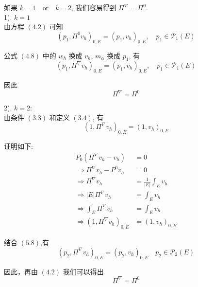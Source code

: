 如果 $k = 1 \quad\text{or}\quad k = 2$, 我们容易得到 $\Pi^\nabla = \Pi^0$. \\

1). $k = 1$ \\

由方程 $(4.2)$ 可知 \\
\begin{equation*}
(p_1,\Pi^0 v_h)_{0,E} = (p_1,v_h)_{0,E},\quad p_1 \in \mathcal{P}_1(E)
\end{equation*}

公式 $(4.8)$ 中的 $w_h$ 换成 $v_h$, $m_\alpha$ 换成 $p_1$, 有 \\
\begin{equation*}
(p_1,\Pi^\nabla v_h)_{0,E} = (p_1,v_h)_{0,E},\quad p_1 \in \mathcal{P}_1(E)
\end{equation*}

因此 \\
\begin{equation*}
\Pi^\nabla = \Pi^0
\end{equation*}

2). $k = 2$: \\

由条件 $(3.3)$ 和定义 $(3.4)$, 有 \\
\begin{equation*}
(1,\Pi^\nabla v_h)_{0,E} = (1,v_h)_{0,E}
\end{equation*}

证明如下: \\
\begin{equation*}
\begin{aligned}
P_0(\Pi^\nabla v_h - v_h) & = 0 \\
\Rightarrow \Pi^\nabla v_h - P^0 v_h & = 0 \\
\Rightarrow \Pi^\nabla v_h & = \frac{1}{|E|} \int_{E}v_h \\
\Rightarrow |E|\Pi^\nabla v_h & = \int_{E}v_h \\
\Rightarrow \int_{E}\Pi^\nabla v_h & = \int_{E}v_h \\
\Rightarrow (1,\Pi^\nabla v_h)_{0,E} & = (1,v_h)_{0,E}
\end{aligned}
\end{equation*}

结合 $(5.8)$,有 \\
\begin{equation*}
(p_2,\Pi^\nabla v_h)_{0,E} = (p_2,v_h)_{0,E}\quad p_2 \in \mathcal{P}_2(E)
\end{equation*}

因此，再由 $(4.2)$ 我们可以得出 \\
\begin{equation*}
\Pi^\nabla = \Pi^0
\end{equation*}

